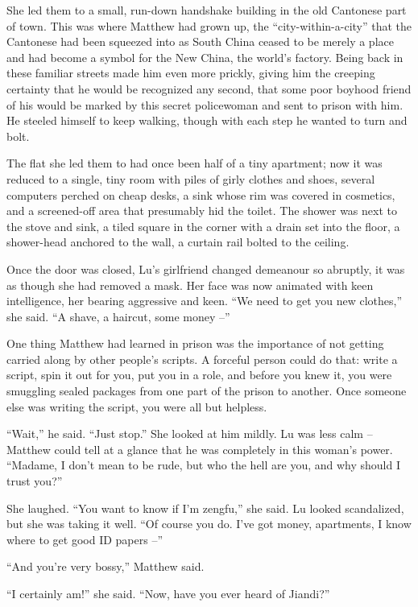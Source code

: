 She led them to a small, run-down handshake building in the old
Cantonese part of town. This was where Matthew had grown up, the
``city-within-a-city'' that the Cantonese had been squeezed into as
South China ceased to be merely a place and had become a symbol for
the New China, the world's factory. Being back in these familiar
streets made him even more prickly, giving him the creeping
certainty that he would be recognized any second, that some poor
boyhood friend of his would be marked by this secret policewoman
and sent to prison with him. He steeled himself to keep walking,
though with each step he wanted to turn and bolt.

The flat she led them to had once been half of a tiny apartment;
now it was reduced to a single, tiny room with piles of girly
clothes and shoes, several computers perched on cheap desks, a sink
whose rim was covered in cosmetics, and a screened-off area that
presumably hid the toilet. The shower was next to the stove and
sink, a tiled square in the corner with a drain set into the floor,
a shower-head anchored to the wall, a curtain rail bolted to the
ceiling.

Once the door was closed, Lu's girlfriend changed demeanour so
abruptly, it was as though she had removed a mask. Her face was now
animated with keen intelligence, her bearing aggressive and keen.
``We need to get you new clothes,'' she said. ``A shave, a haircut,
some money --''

One thing Matthew had learned in prison was the importance of not
getting carried along by other people's scripts. A forceful person
could do that: write a script, spin it out for you, put you in a
role, and before you knew it, you were smuggling sealed packages
from one part of the prison to another. Once someone else was
writing the script, you were all but helpless.

``Wait,'' he said. ``Just stop.'' She looked at him mildly. Lu was less
calm -- Matthew could tell at a glance that he was completely in
this woman's power. ``Madame, I don't mean to be rude, but who the
hell are you, and why should I trust you?''

She laughed. ``You want to know if I'm zengfu,'' she said. Lu looked
scandalized, but she was taking it well. ``Of course you do. I've
got money, apartments, I know where to get good ID papers --''

``And you're very bossy,'' Matthew said.

``I certainly am!'' she said. ``Now, have you ever heard of Jiandi?''

